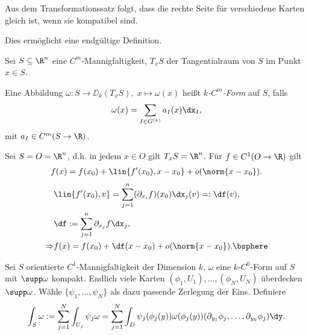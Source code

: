 \begin{bem}
\label{bem:4.76}
Aus dem Transformationssatz folgt, dass die rechte Seite für verschiedene
Karten gleich ist, wenn sie kompatibel sind.\maphere
\end{bem}

Dies ermöglicht eine endgültige Definition.
\begin{defn}
\label{defn:4.77}
Sei $S\subseteq\R^n$ eine $C^m$-Mannigfaltigkeit, $T_xS$ der Tangentialraum von
$S$ im Punkt $x\in S$.

Eine Abbildung $\omega: S\to\DD_k(T_xS),\; x\mapsto \omega(x)$ heißt
\emph{$k$-$C^m$-Form} auf $S$, falls
\begin{align*}
\omega(x) = \sum\limits_{I\in G^{(k)}} a_I(x)\dx_I,
\end{align*}
mit $a_I\in C^m(S\to\R)$.\fishhere
\end{defn}

\begin{bsp}
\label{bsp:4.78}
Sei $S=O=\R^n$, d.h. in jedem $x\in O$ gilt $T_xS = \R^n$. Für $f\in
C^1(O\to\R)$ gilt
\begin{align*}
f(x) = f(x_0) + \lin{f'(x_0),x-x_0} + o(\norm{x-x_0}).
\end{align*}
\begin{align*}
&\lin{f'(x_0),v} = \sum\limits_{j=1}^n (\partial_{x_i} f)(x_0) \dx_j(v) =:
\df(v),\\
&\df := \sum\limits_{j=1}^n \partial_{x_j}f \dx_j,\\
\Rightarrow & f(x) = f(x_0) + \df(x-x_0) + o(\norm{x-x_0}).\bsphere
\end{align*}
\end{bsp}

\begin{defn}
\label{defn:4.79}
Sei $S$ orientierte $C^1$-Mannigfaltigkeit der Dimension $k$, $\omega$ eine
$k$-$C^0$-Form auf $S$ mit $\supp \omega $ kompakt. Endlich viele Karten
$(\phi_1,U_1),\ldots,(\phi_N,U_N)$ überdecken $\supp\omega$. Wähle
$\{\psi_1,\ldots,\psi_N\}$ als dazu passende Zerlegung der Eins. Definiere
\begin{align*}
\int_S \omega := \sum\limits_{j=1}^N \int_{U_j} \psi_j \omega =
\sum\limits_{j=1}^N \int_D
\psi_j(\phi_j(y))\omega(\phi_j(y))(\partial_{y_1}\phi_j,\ldots,\partial_{y_k}\phi_j)\dy.
\end{align*}
\end{defn}
